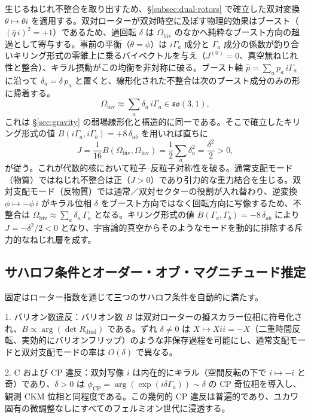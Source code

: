 \documentclass[dvipdfmx,a4paper]{article}
\begin{document}
生じるねじれ不整合を取り出すため、\S\ref{subsec:dual-rotors} で確立した双対変換 $\theta \mapsto \theta i$ を適用する。双対ローターが双対時空に及ぼす物理的効果はブースト（$(\hat q\, i)^2 = +1$）であるため、過回転 $\delta$ は $\Omega_\text{biv}$ のなかへ純粋なブースト方向の超過として寄与する。事前の平衡（$\theta = \phi$）は $i\Gamma_a$ 成分と $\Gamma_a$ 成分の係数が釣り合いキリング形式の零錐上に乗るバイベクトルを与え（$J^{(0)} = 0$、真空無ねじれ性と整合）、キラル摂動がこの均衡を非対称に破る。ブースト軸 $\hat p = \sum_a p_a\, i\Gamma_a$ に沿って $\delta_a = \delta\, p_a$ と置くと、線形化された不整合は次のブースト成分のみの形に帰着する。
\[
\Omega_\text{biv} \approx \sum_a \delta_a\, i\Gamma_a \in \mathfrak{so}(3,1),
\]
これは \S\ref{sec:gravity} の弱場線形化と構造的に同一である。そこで確立したキリング形式の値 $B(i\Gamma_a, i\Gamma_b) = +8\,\delta_{ab}$ を用いれば直ちに
\[
J = \frac{1}{16} B(\Omega_\text{biv}, \Omega_\text{biv}) = \frac{1}{2}\sum_a \delta_a^2 = \frac{\delta^2}{2} > 0,
\]
が従う。これが代数的核において粒子--反粒子対称性を破る。通常支配モード（物質）ではねじれ不整合は正（$J > 0$）であり引力的な重力結合を生じる。双対支配モード（反物質）では通常／双対セクターの役割が入れ替わり、逆変換 $\phi \mapsto -\phi\, i$ がキラル位相 $\delta$ をブースト方向ではなく回転方向に写像するため、不整合は $\Omega_\text{biv} \approx \sum_a \delta_a\, \Gamma_a$ となる。キリング形式の値 $B(\Gamma_a, \Gamma_b) = -8\,\delta_{ab}$ により $J = -\delta^2/2 < 0$ となり、宇宙論的真空からそのようなモードを動的に排除する斥力的なねじれ層を成す。

\subsection{サハロフ条件とオーダー・オブ・マグニチュード推定}

固定はローター指数を通じて三つのサハロフ条件を自動的に満たす。

1. バリオン数違反：バリオン数 $B$ は双対ローターの擬スカラー位相に符号化され、$B \propto \arg(\det R_\text{dual})$ である。ずれ $\delta \neq 0$ は $X \mapsto X i i = -X$（二重時間反転、実効的にバリオンフリップ）のような非保存過程を可能にし、通常支配モードと双対支配モードの率は $O(\delta)$ で異なる。

2. C および CP 違反：双対写像 $i$ は内在的にキラル（空間反転の下で $i \mapsto -i$ と奇）であり、$\delta > 0$ は $\phi_\text{CP} = \arg(\exp(i \delta \Gamma_a)) \sim \delta$ の CP 奇位相を導入し、観測 CKM 位相と同程度である。この幾何的 CP 違反は普遍的であり、ユカワ固有の微調整なしにすべてのフェルミオン世代に浸透する。
\end{document}

